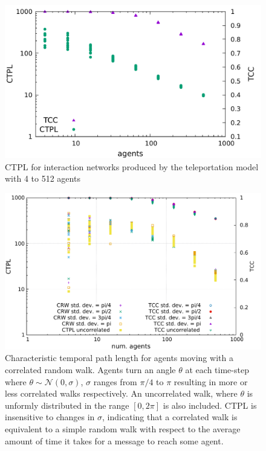 \documentclass[conference]{IEEEtran}
\begin{document}
\begin{figure}
  \includegraphics[width=\columnwidth]{teleport-scale.pdf}
  \caption{CTPL for interaction networks produced by the teleportation
    model with 4 to 512 agents}
  \label{fig:teleport-scale}
\end{figure}

\begin{figure}
  \includegraphics[width=\columnwidth]{correlated-scaling.pdf}
  \caption{Characteristic temporal path length for agents moving with
    a correlated random walk. Agents turn an angle $\theta$ at each
    time-step where $\theta \sim \mathcal{N}(0,\sigma)$, $\sigma$
    ranges from $\pi/4$ to $\pi$ resulting in more or less correlated
    walks respectively. An uncorrelated walk, where $\theta$ is
    unformly distributed in the range $[0, 2\pi]$ is also
    included. CTPL is insensitive to changes in $\sigma$, indicating
    that a correlated walk is equivalent to a simple random walk with
    respect to the average amount of time it takes for a message to
    reach some agent.}
  \label{fig:crw-scale}
\end{figure}
\end{document}
